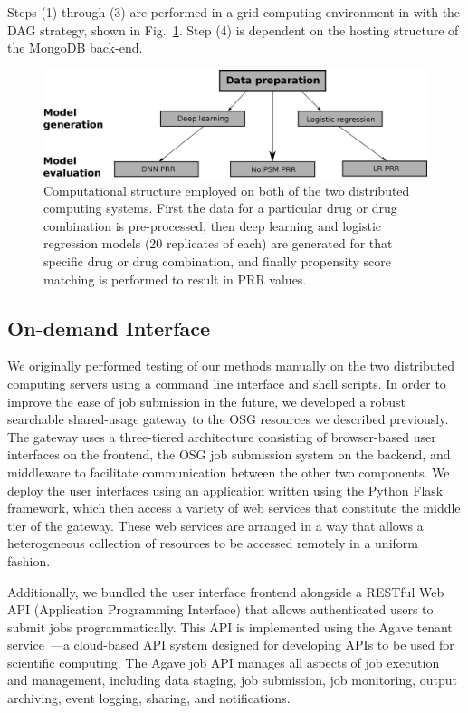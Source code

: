 \documentclass{ws-procs11x85}
\begin{document}
Steps (1) through (3) are performed in a grid computing environment in
with the DAG strategy, shown in Fig.~\ref{fig:dag}.  Step (4) is
dependent on the hosting structure of the MongoDB back-end.

\begin{figure}[h]
\centerline{\includegraphics[width=\textwidth]{dag}}
\caption{Computational structure employed on both of the two distributed computing
  systems. First the data for a particular drug or drug combination is
  pre-processed, then deep learning and logistic regression models (20 replicates of each)
  are generated for that specific drug or drug combination, and finally
  propensity score matching is performed to result in PRR values.}
\label{fig:dag}
\end{figure}


\subsection{On-demand Interface}
We originally performed testing of our methods manually on the two
distributed computing servers using a command line interface and shell
scripts. In order to improve the ease of job submission in the future,
we developed a robust searchable shared-usage gateway to the OSG
resources we described previously. The gateway uses a
three-tiered architecture consisting of browser-based user interfaces
on the frontend, the OSG job submission system on the backend, and
middleware to facilitate communication between the other two
components. We deploy the user interfaces using an application written
using the Python Flask framework, which then access a variety of web
services that constitute the middle tier of the gateway. These web
services are arranged in a way that allows a heterogeneous collection
of resources to be accessed remotely in a uniform fashion.

Additionally, we bundled the user interface frontend alongside a
RESTful Web API (Application Programming Interface) that allows
authenticated users to submit jobs programmatically. This API is
implemented using the Agave tenant service~\cite{dooley2012agave}---a
cloud-based API system designed for developing APIs to be used for
scientific computing. The Agave job API manages all aspects of job
execution and management, including data staging, job submission, job
monitoring, output archiving, event logging, sharing, and
notifications.
\end{document}
